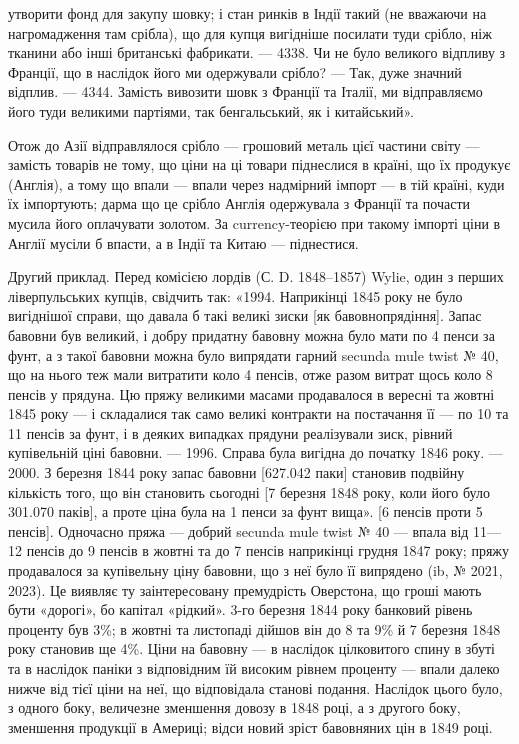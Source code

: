 \parcont{}  %
утворити фонд для закупу шовку; і стан ринків в Індії такий (не вважаючи на
нагромадження там срібла), що для купця вигідніше посилати туди срібло, ніж
тканини або інші британські фабрикати. — 4338. Чи не було великого відпливу
з Франції, що в наслідок його ми одержували срібло? — Так, дуже значний відплив.
— 4344. Замість вивозити шовк з Франції та Італії, ми відправляємо його
туди великими партіями, так бенгальський, як і китайський».

Отож до Азії відправлялося срібло — грошовий металь цієї частини світу —
замість товарів не тому, що ціни на ці товари піднеслися в країні, що їх продукує
(Англія), а тому що впали — впали через надмірний імпорт — в тій країні,
куди їх імпортують; дарма що це срібло Англія одержувала з Франції та почасти
мусила його оплачувати золотом. За currency-теорією при такому імпорті
ціни в Англії мусіли б впасти, а в Індії та Китаю — піднестися.

Другий приклад. Перед комісією лордів (С. D. 1848--1857) Wylie, один
з    перших ліверпульських купців, свідчить так: «1994. Наприкінці 1845 року
не було вигіднішої справи, що давала б такі великі зиски [як бавовнопрядіння].
Запас бавовни був великий, і добру придатну бавовну можна було мати по
4    пенси за фунт, а з такої бавовни можна було випрядати гарний secunda
mule twist № 40, що на нього теж мали витратити коло 4 пенсів, отже разом
витрат щось коло 8 пенсів у прядуна. Цю пряжу великими масами продавалося
в вересні та жовтні 1845 року — і складалися так само великі контракти на
постачання її — по 10 та 11 пенсів за фунт, і в деяких випадках прядуни
реалізували зиск, рівний купівельній ціні бавовни. — 1996. Справа була вигідна
до початку 1846 року. — 2000. З березня 1844 року запас бавовни [627.042 паки]
становив подвійну кількість того, що він становить сьогодні [7 березня 1848 року,
коли його було 301.070 паків], а проте ціна була на 1 пенси за фунт вища».
[6 пенсів проти 5 пенсів]. Одночасно пряжа — добрий secunda mule twist
№ 40 — впала від 11—12 пенсів до 9 пенсів в жовтні та до 7 пенсів
наприкінці грудня 1847 року; пряжу продавалося за купівельну ціну бавовни,
що з неї було її випрядено (ib, № 2021, 2023). Це виявляє ту заінтересовану
премудрість Оверстона, що гроші мають бути «дорогі», бо капітал «рідкий». 3-го березня
1844 року банковий рівень проценту був 3\%; в жовтні та листопаді
дійшов він до 8 та 9\% й 7 березня 1848 року становив ще 4\%. Ціни на бавовну
— в наслідок цілковитого спину в збуті та в наслідок паніки з відповідним
їй високим рівнем проценту — впали далеко нижче від тієї ціни на неї,
що відповідала станові подання. Наслідок цього було, з одного боку, величезне
зменшення довозу в 1848 році, а з другого боку, зменшення продукції в Америці;
відси новий зріст бавовняних цін в 1849 році.

